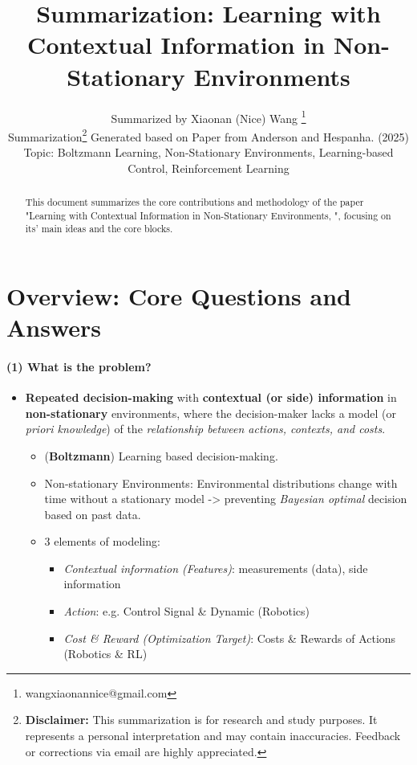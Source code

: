 \documentclass{article}
\title{Summarization: Learning with Contextual Information in Non-Stationary Environments}
\author{
  Summarized by Xiaonan (Nice) Wang \thanks{wangxiaonannice@gmail.com} \\
  Summarization\thanks{\textbf{Disclaimer:} This summarization is for research and study purposes. It represents a personal interpretation and may contain inaccuracies. Feedback or corrections via email are highly appreciated.} Generated based on Paper from Anderson and Hespanha. (2025) \\
  Topic: Boltzmann Learning, Non-Stationary Environments, Learning-based Control, Reinforcement Learning\\
}
\begin{document}
\newcommand{\repeatfootnote}[1]{\textsuperscript{\ref{#1}}}

\maketitle

\begin{abstract}
This document summarizes the core contributions and methodology of the paper "Learning with Contextual Information in Non-Stationary Environments, \cite{anderson2025learning}", focusing on its' main ideas and the core blocks.
\end{abstract}

\section{Overview: Core Questions and Answers}
                           
\paragraph{(1) What is the problem?} 
\begin{itemize}
  \item \textbf{Repeated decision-making} with \textbf{contextual (or side) information} in \textbf{non-stationary} environments, where the decision-maker lacks a model (or \textit{priori knowledge}) of the \textit{relationship between actions, contexts, and costs}.
  \begin{itemize}
    \item (\textbf{Boltzmann}) Learning based decision-making.
    \item Non-stationary Environments: Environmental distributions change with time without a stationary model -> preventing \textit{Bayesian optimal} decision based on past data.
    \item 3 elements of modeling:
    \begin{itemize}
      \item \textit{Contextual information (Features)}: measurements (data), side information
      \item \textit{Action}: e.g. Control Signal \& Dynamic (Robotics)
      \item \textit{Cost \& Reward (Optimization Target)}: Costs \& Rewards of Actions (Robotics \& RL)
    \end{itemize}
  \end{itemize}
\end{itemize}
\end{document}

